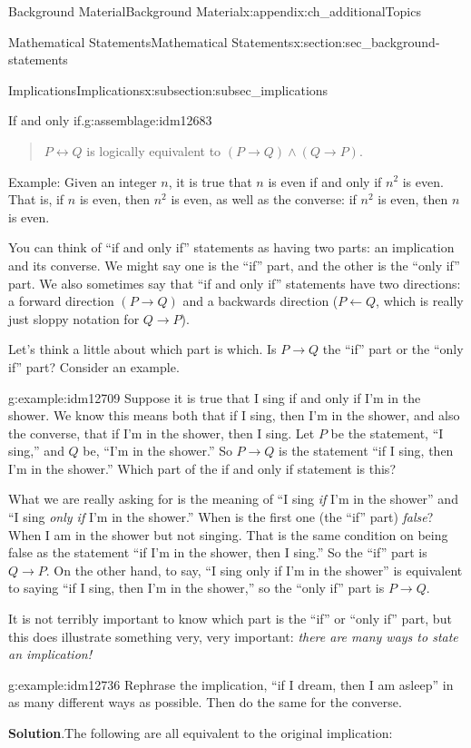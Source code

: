 \documentclass[oneside,10pt,]{book}
\numberwithin{equation}{chapter}
\def\iff{\leftrightarrow}
\def\imp{\rightarrow}
\begin{document}
\begin{appendixptx}{Background Material}{}{Background Material}{}{}{x:appendix:ch_additionalTopics}
\begin{sectionptx}{Mathematical Statements}{}{Mathematical Statements}{}{}{x:section:sec_background-statements}
\begin{subsectionptx}{Implications}{}{Implications}{}{}{x:subsection:subsec_implications}
\begin{assemblage}{If and only if.}{g:assemblage:idm12683}
\begin{quote}%
\(P \iff Q\) is logically equivalent to \((P \imp Q) \wedge (Q \imp P)\).%
\end{quote}
Example: Given an integer \(n\), it is true that \(n\) is even if and only if \(n^2\) is even. That is, if \(n\) is even, then \(n^2\) is even, as well as the converse: if \(n^2\) is even, then \(n\) is even.%
\end{assemblage}
You can think of ``if and only if'' statements as having two parts: an implication and its converse. We might say one is the ``if'' part, and the other is the ``only if'' part. We also sometimes say that ``if and only if'' statements have two directions: a forward direction \((P \imp Q)\) and a backwards direction (\(P \leftarrow Q\), which is really just sloppy notation for \(Q \imp P\)).%
\par
Let's think a little about which part is which. Is \(P \imp Q\) the ``if'' part or the ``only if'' part? Consider an example.%
\begin{example}{}{g:example:idm12709}%
Suppose it is true that I sing if and only if I'm in the shower. We know this means both that if I sing, then I'm in the shower, and also the converse, that if I'm in the shower, then I sing. Let \(P\) be the statement, ``I sing,'' and \(Q\) be, ``I'm in the shower.'' So \(P \imp Q\) is the statement ``if I sing, then I'm in the shower.'' Which part of the if and only if statement is this?%
\par
What we are really asking for is the meaning of ``I sing \emph{if} I'm in the shower'' and ``I sing \emph{only if} I'm in the shower.'' When is the first one (the ``if'' part) \emph{false}? When I am in the shower but not singing. That is the same condition on being false as the statement ``if I'm in the shower, then I sing.'' So the ``if'' part is \(Q \imp P\). On the other hand, to say, ``I sing only if I'm in the shower'' is equivalent to saying ``if I sing, then I'm in the shower,'' so the ``only if'' part is \(P \imp Q\).%
\end{example}
It is not terribly important to know which part is the ``if'' or ``only if'' part, but this does illustrate something very, very important: \emph{there are many ways to state an implication!}%
\begin{example}{}{g:example:idm12736}%
Rephrase the implication, ``if I dream, then I am asleep'' in as many different ways as possible. Then do the same for the converse.%
\par\smallskip%
\noindent\textbf{Solution}.\hypertarget{g:solution:idm12740}{}\quad{}The following are all equivalent to the original implication:%

\end{example}
\end{subsectionptx}
\end{sectionptx}
\end{appendixptx}
\end{document}
